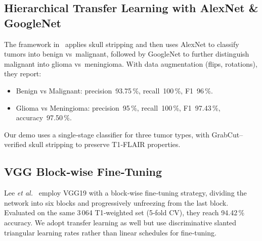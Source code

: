 \subsection{Hierarchical Transfer Learning with AlexNet \& GoogleNet}
The framework in~\cite{kulkarni2020framework} applies skull stripping and then uses AlexNet to classify tumors into benign vs malignant, followed by GoogleNet to further distinguish malignant into glioma vs meningioma. With data augmentation (flips, rotations), they report:
\begin{itemize}
  \item Benign vs Malignant: precision 93.75\,\%, recall 100\,\%, F1 96\,\%.
  \item Glioma vs Meningioma: precision 95\,\%, recall 100\,\%, F1 97.43\,\%, accuracy 97.50\,\%.
\end{itemize}
Our demo uses a single‑stage classifier for three tumor types, with GrabCut–verified skull stripping to preserve T1‑FLAIR properties.

\subsection{VGG Block‑wise Fine‑Tuning}
Lee \emph{et al.}~\cite{swati2019transfer} employ VGG19 with a block‑wise fine‑tuning strategy, dividing the network into six blocks and progressively unfreezing from the last block. Evaluated on the same 3\,064 T1‑weighted set (5‑fold CV), they reach 94.42\,\% accuracy. We adopt transfer learning as well but use discriminative slanted triangular learning rates rather than linear schedules for fine‑tuning.

